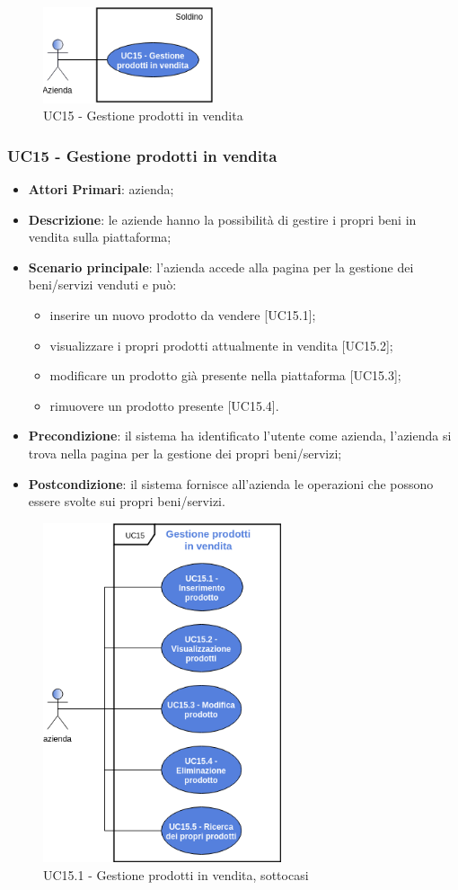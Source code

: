 \begin{figure}[h]
	\includegraphics[width=5cm]{res/images/UC15-Generale.png}
	\centering
	\caption{UC15 - Gestione prodotti in vendita}
\end{figure}
\subsubsection{UC15 - Gestione prodotti in vendita}
\begin{itemize}
	\item \textbf{Attori Primari}: azienda;
	\item \textbf{Descrizione}: le aziende hanno la possibilità di gestire i propri beni in vendita sulla piattaforma;
	\item \textbf{Scenario principale}: l'azienda accede alla pagina per la gestione dei beni/servizi venduti e può:
	\begin{itemize}
		\item inserire un nuovo prodotto da vendere [UC15.1];
		\item visualizzare i propri prodotti attualmente in vendita [UC15.2];
		\item modificare un prodotto già presente nella piattaforma [UC15.3];
		\item rimuovere un prodotto presente [UC15.4].
	\end{itemize}
	\item \textbf{Precondizione}: il sistema ha identificato l'utente come azienda, l'azienda si trova nella pagina per la gestione dei propri beni/servizi;
	\item \textbf{Postcondizione}: il sistema fornisce all'azienda le operazioni che possono essere svolte sui propri beni/servizi.	
\end{itemize}
\begin{figure}[h]
	\includegraphics[width=7cm]{res/images/UC15.png}
	\centering
	\caption{UC15.1 - Gestione prodotti in vendita, sottocasi}
\end{figure}
